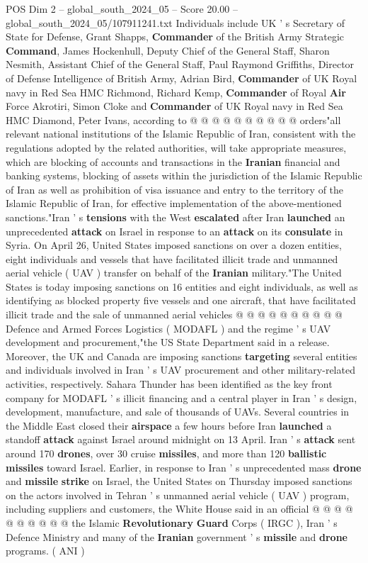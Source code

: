 \begin{textsample}{POS Dim 2 – global\_south\_2024\_05 – Score 20.00 – global\_south\_2024\_05/107911241.txt}
Individuals include UK ' s Secretary of State for Defense, Grant Shapps, \textbf{Commander} of the British Army Strategic \textbf{Command}, James Hockenhull, Deputy Chief of the General Staff, Sharon Nesmith, Assistant Chief of the General Staff, Paul Raymond Griffiths, Director of Defense Intelligence of British Army, Adrian Bird, \textbf{Commander} of UK Royal navy in Red Sea HMC Richmond, Richard Kemp, \textbf{Commander} of Royal \textbf{Air} Force Akrotiri, Simon Cloke and \textbf{Commander} of UK Royal navy in Red Sea HMC Diamond, Peter Ivans, according to @ @ @ @ @ @ @ @ @ @ orders"all relevant national institutions of the Islamic Republic of Iran, consistent with the regulations adopted by the related authorities, will take appropriate measures, which are blocking of accounts and transactions in the \textbf{Iranian} financial and banking systems, blocking of assets within the jurisdiction of the Islamic Republic of Iran as well as prohibition of visa issuance and entry to the territory of the Islamic Republic of Iran, for effective implementation of the above-mentioned sanctions."Iran ' s \textbf{tensions} with the West \textbf{escalated} after Iran \textbf{launched} an unprecedented \textbf{attack} on Israel in response to an \textbf{attack} on its \textbf{consulate} in Syria.
On April 26, United States imposed sanctions on over a dozen entities, eight individuals and vessels that have facilitated illicit trade and unmanned aerial vehicle ( UAV ) transfer on behalf of the \textbf{Iranian} military."The United States is today imposing sanctions on 16 entities and eight individuals, as well as identifying as blocked property five vessels and one aircraft, that have facilitated illicit trade and the sale of unmanned aerial vehicles @ @ @ @ @ @ @ @ @ @ Defence and Armed Forces Logistics ( MODAFL ) and the regime ' s UAV development and procurement,"the US State Department said in a release.
Moreover, the UK and Canada are imposing sanctions \textbf{targeting} several entities and individuals involved in Iran ' s UAV procurement and other military-related activities, respectively.
Sahara Thunder has been identified as the key front company for MODAFL ' s illicit financing and a central player in Iran ' s design, development, manufacture, and sale of thousands of UAVs.
Several countries in the Middle East closed their \textbf{airspace} a few hours before Iran \textbf{launched} a standoff \textbf{attack} against Israel around midnight on 13 April.
Iran ' s \textbf{attack} sent around 170 \textbf{drones}, over 30 cruise \textbf{missiles}, and more than 120 \textbf{ballistic} \textbf{missiles} toward Israel.
Earlier, in response to Iran ' s unprecedented mass \textbf{drone} and \textbf{missile} \textbf{strike} on Israel, the United States on Thursday imposed sanctions on the actors involved in Tehran ' s unmanned aerial vehicle ( UAV ) program, including suppliers and customers, the White House said in an official @ @ @ @ @ @ @ @ @ @ the Islamic \textbf{Revolutionary} \textbf{Guard} Corps ( IRGC ), Iran ' s Defence Ministry and many of the \textbf{Iranian} government ' s \textbf{missile} and \textbf{drone} programs. ( ANI )


\end{textsample}
